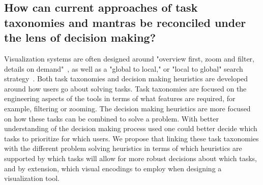 


\subsection{How can current approaches of task taxonomies and mantras be reconciled under the lens of decision making?}


Visualization systems are often designed around "overview first, zoom and
filter, details on demand"~\cite{Shneiderman:1996}, as well as a "global to local,"
or "local to global" search strategy~\cite{Sedlmair:2014}. Both task 
taxonomies and decision making heuristics are developed around how users
go about solving tasks.
Task taxonomies
are focused on the engineering aspects of the tools in terms of what
features are required, for example, filtering or zooming. The decision
making heuristics are more focused on how these tasks can be combined to
solve a problem.
With better understanding of the decision making process used one could better decide which tasks to prioritize for which users.
We propose that linking these task taxonomies with the different problem 
solving heuristics in terms of which heuristics are supported by which 
tasks will allow for more robust decisions about which tasks, and by
extension, which visual encodings to employ when designing a visualization
tool.


